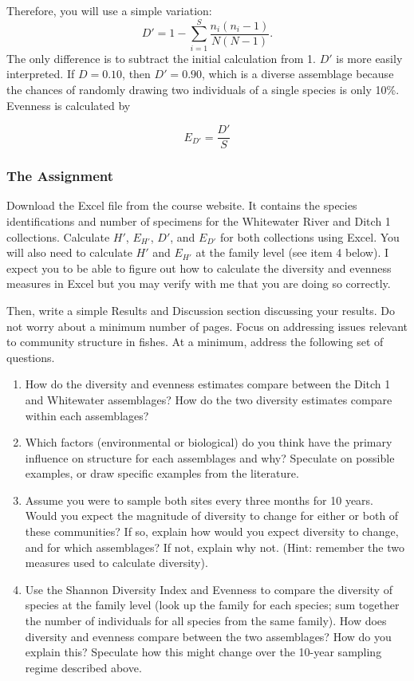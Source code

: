 \documentclass[12pt]{article}
\begin{document}
Therefore, you will use a simple variation:
\begin{equation*}
D' = 1 - \sum_{i=1}^{S} \frac{n_i(n_i-1)}{N(N-1)}.
\end{equation*}
The only difference is to subtract the initial calculation from 1. $D'$ is more easily interpreted. If $D = 0.10$, then $D' = 0.90$, which is a diverse assemblage because the chances of randomly drawing two individuals of a single species is only 10\%.  Evenness is calculated by

\begin{equation*}
E_{D'} = \frac{D'}{S}
\end{equation*}

\subsubsection*{The Assignment}

Download the Excel file from the course website. It contains the species identifications and number of specimens for the Whitewater River and Ditch 1 collections. Calculate $H'$, $E_{H'}$, $D'$, and $E_{D'}$ for both collections using Excel.  You will also need to calculate $H'$ and $E_{H'}$ at the family level (see item 4 below). I expect you to be able to figure out how to calculate the diversity and evenness measures in Excel but you may verify with me that you are doing so correctly.

Then, write a simple Results and Discussion section discussing your results.  Do not worry about a minimum number of pages.  Focus on addressing issues relevant to community structure in fishes.  At a minimum, address the following set of questions.
\begin{enumerate}
\item How do the diversity and evenness estimates compare between the Ditch 1 and Whitewater assemblages?  How do the two diversity estimates compare within each assemblages?

\item Which factors (environmental or biological) do you think have the primary influence on structure for each assemblages and why?  Speculate on possible examples, or draw specific examples from the literature.

\item Assume you were to sample both sites every three months for 10 years.  Would you expect the magnitude of diversity to change for either or both of these communities?  If so, explain how would you expect diversity to change, and for which assemblages?  If not, explain why not.  (Hint: remember the two measures used to calculate diversity).  

\item Use the Shannon Diversity Index and Evenness to compare the diversity of species at the family level (look up the family for each species; sum together the number of individuals for all species from the same family).  How does diversity and evenness compare between the two assemblages?  How do you explain this?  Speculate how this might change over the 10-year sampling regime described above.
\end{enumerate}
\end{document}

